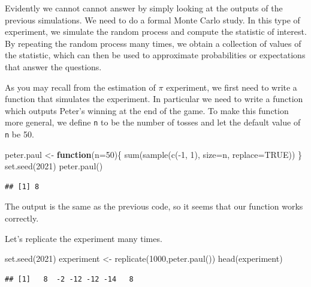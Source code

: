 \documentclass[
]{book}
\newenvironment{Shaded}{\begin{snugshade}}{\end{snugshade}}
\newcommand{\AttributeTok}[1]{\textcolor[rgb]{0.77,0.63,0.00}{#1}}
\newcommand{\ConstantTok}[1]{\textcolor[rgb]{0.00,0.00,0.00}{#1}}
\newcommand{\ControlFlowTok}[1]{\textcolor[rgb]{0.13,0.29,0.53}{\textbf{#1}}}
\newcommand{\DecValTok}[1]{\textcolor[rgb]{0.00,0.00,0.81}{#1}}
\newcommand{\FunctionTok}[1]{\textcolor[rgb]{0.00,0.00,0.00}{#1}}
\newcommand{\NormalTok}[1]{#1}
\newcommand{\OtherTok}[1]{\textcolor[rgb]{0.56,0.35,0.01}{#1}}
\newcommand{\SpecialCharTok}[1]{\textcolor[rgb]{0.00,0.00,0.00}{#1}}
\theoremstyle{definition}
\theoremstyle{definition}
\theoremstyle{definition}
\theoremstyle{definition}
\theoremstyle{remark}
\begin{document}
Evidently we cannot cannot answer by simply looking at the outputs of the previous simulations. We need to do a formal Monte Carlo study. In this type of experiment, we simulate the random process and compute the statistic of interest. By repeating the random process many times, we obtain a collection of values of the statistic, which can then be used to approximate probabilities or expectations that answer the questions.

As you may recall from the estimation of \(\pi\) experiment, we first need to write a function that simulates the experiment. In particular we need to write a function which outputs Peter's winning at the end of the game. To make this function more general, we define \texttt{n} to be the number of tosses and let the default value of \texttt{n} be 50.

\begin{Shaded}
\begin{Highlighting}[]
\NormalTok{peter.paul }\OtherTok{\textless{}{-}} \ControlFlowTok{function}\NormalTok{(}\AttributeTok{n=}\DecValTok{50}\NormalTok{)\{}
  \FunctionTok{sum}\NormalTok{(}\FunctionTok{sample}\NormalTok{(}\FunctionTok{c}\NormalTok{(}\SpecialCharTok{{-}}\DecValTok{1}\NormalTok{, }\DecValTok{1}\NormalTok{), }\AttributeTok{size=}\NormalTok{n, }\AttributeTok{replace=}\ConstantTok{TRUE}\NormalTok{))}
\NormalTok{\}}
\FunctionTok{set.seed}\NormalTok{(}\DecValTok{2021}\NormalTok{)}
\FunctionTok{peter.paul}\NormalTok{()}
\end{Highlighting}
\end{Shaded}

\begin{verbatim}
## [1] 8
\end{verbatim}

The output is the same as the previous code, so it seems that our function works correctly.

Let's replicate the experiment many times.

\begin{Shaded}
\begin{Highlighting}[]
\FunctionTok{set.seed}\NormalTok{(}\DecValTok{2021}\NormalTok{)}
\NormalTok{experiment }\OtherTok{\textless{}{-}} \FunctionTok{replicate}\NormalTok{(}\DecValTok{1000}\NormalTok{,}\FunctionTok{peter.paul}\NormalTok{())}
\FunctionTok{head}\NormalTok{(experiment)}
\end{Highlighting}
\end{Shaded}

\begin{verbatim}
## [1]   8  -2 -12 -12 -14   8
\end{verbatim}
\end{document}

